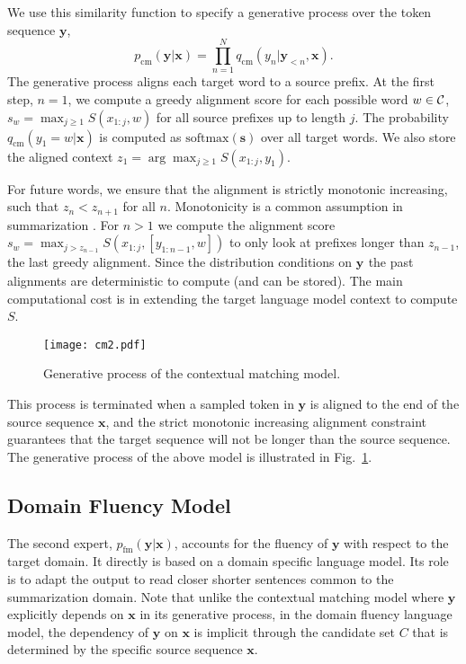 \documentclass[11pt,a4paper]{article}
\newcommand{\bx}{\mathbf{x}}
\newcommand{\by}{\mathbf{y}}
\newcommand{\ps}{p_{\mathrm{cm}}}
\newcommand{\pl}{p_{\mathrm{fm}}}
\newcommand{\qs}{q_{\mathrm{cm}}}
\newcommand{\softmax}{\mathrm{softmax}}
\begin{document}
We use this similarity function to specify a generative process over the token sequence $\by$,
\[\ps(\by|\bx) = \prod_{n=1}^N \qs(y_n | \by_{<n}, \bx).\]
\noindent
The generative process aligns each 
target word to a source prefix. At the first step, $n=1$, we compute a greedy alignment score for each
possible word $w \in {\cal C}$, $s_w = \max_{j \geq 1} S(x_{1:j}, w)$ for all source prefixes up to length $j$. The probability $\qs(y_1 =w | \bx)$ is computed as $\softmax(\mathbf{s})$ over all target words. We also store the aligned context $z_1 = \arg\max_{j \geq 1} S(x_{1:j}, y_{1})$. 

For future words, we ensure that the alignment is strictly monotonic increasing, such that $z_n<z_{n+1}$ for all $n$. Monotonicity is a common assumption in summarization \cite{yu2016neural, yu2016online, raffel2017online}. For $n>1$ we compute the alignment score $s_w = \max_{j > z_{n-1}} S(x_{1:j}, [y_{1:n-1}, w])$ to only look at prefixes longer than $z_{n-1}$, the last greedy alignment. Since the distribution conditions on $\by_{}$ the past alignments are deterministic to compute (and can be stored). The main computational cost is in extending the target language model context to compute $S$. 



\begin{figure}
    \centering
\texttt{[image: cm2.pdf]}
\caption{Generative process of the contextual matching model.}
    \label{fig:ps}
\end{figure}







This process is terminated when a sampled token in $\by$ is aligned to the end of the source sequence $\bx$, and the strict monotonic increasing alignment constraint guarantees that the target sequence will not be longer than the source sequence. The generative process of the above model is illustrated in Fig.~\ref{fig:ps}.


\subsection{Domain Fluency Model}

The second expert, $\pl(\by|\bx)$, accounts for the  fluency of $\by$ with respect to the target domain. It directly is based on a domain specific language model. Its role is to adapt the output to read closer shorter sentences common to the summarization domain. Note that unlike the contextual matching model where $\by$ explicitly depends on $\bx$ in its generative process, in the domain fluency language model, the dependency of $\by$ on $\bx$ is implicit through the candidate set $C$ that is determined by the specific source sequence $\bx$.
\end{document}
